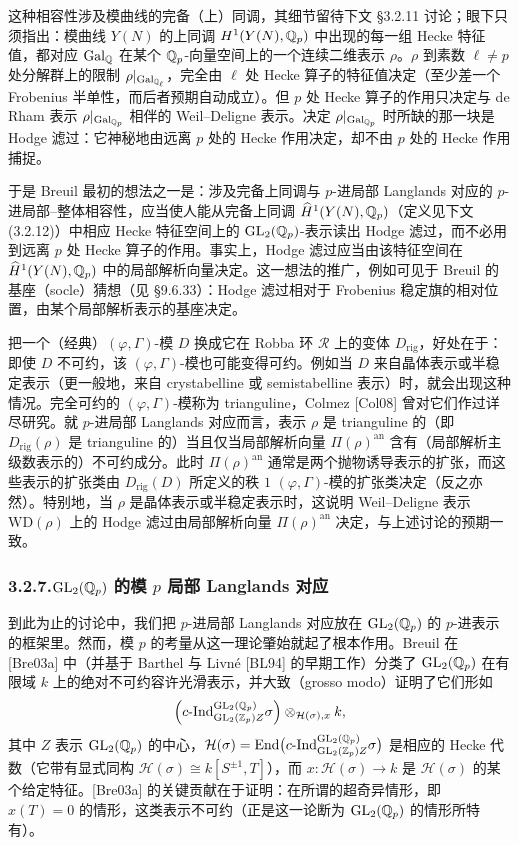 这种相容性涉及模曲线的完备（上）同调，其细节留待下文 §3.2.11 讨论；眼下只须指出：模曲线 $Y(N)$ 的上同调 $H^1(Y(N),\mathbb{Q}_p)$ 中出现的每一组 Hecke 特征值，都对应 $\operatorname{Gal}_{\mathbb{Q}}$ 在某个 $\mathbb{Q}_p$-向量空间上的一个连续二维表示 $\rho$。$\rho$ 到素数 $\ell\neq p$ 处分解群上的限制 $\rho|_{\operatorname{Gal}_{\mathbb{Q}_\ell}}$，完全由 $\ell$ 处 Hecke 算子的特征值决定（至少差一个 Frobenius 半单性，而后者预期自动成立）。但 $p$ 处 Hecke 算子的作用只决定与 de Rham 表示 $\rho|_{\operatorname{Gal}_{\mathbb{Q}_p}}$ 相伴的 Weil--Deligne 表示。决定 $\rho|_{\operatorname{Gal}_{\mathbb{Q}_p}}$ 时所缺的那一块是 Hodge 滤过：它神秘地由远离 $p$ 处的 Hecke 作用决定，却不由 $p$ 处的 Hecke 作用捕捉。

于是 Breuil 最初的想法之一是：涉及完备上同调与 $p$-进局部 Langlands 对应的 $p$-进局部--整体相容性，应当使人能从完备上同调 $\widehat H^1(Y(N),\mathbb{Q}_p)$（定义见下文 (3.2.12)）中相应 Hecke 特征空间上的 $\mathrm{GL}_2(\mathbb{Q}_p)$-表示读出 Hodge 滤过，而不必用到远离 $p$ 处 Hecke 算子的作用。事实上，Hodge 滤过应当由该特征空间在 $\widehat H^1(Y(N),\mathbb{Q}_p)$ 中的局部解析向量决定。这一想法的推广，例如可见于 Breuil 的基座（socle）猜想（见 §9.6.33）：Hodge 滤过相对于 Frobenius 稳定旗的相对位置，由某个局部解析表示的基座决定。

把一个（经典）$(\varphi,\Gamma)$-模 $D$ 换成它在 Robba 环 $\mathcal R$ 上的变体 $D_{\mathrm{rig}}$，好处在于：即使 $D$ 不可约，该 $(\varphi,\Gamma)$-模也可能变得可约。例如当 $D$ 来自晶体表示或半稳定表示（更一般地，来自 crystabelline 或 semistabelline 表示）时，就会出现这种情况。完全可约的 $(\varphi,\Gamma)$-模称为 trianguline，Colmez [Col08] 曾对它们作过详尽研究。就 $p$-进局部 Langlands 对应而言，表示 $\rho$ 是 trianguline 的（即 $D_{\mathrm{rig}}(\rho)$ 是 trianguline 的）当且仅当局部解析向量 $\Pi(\rho)^{\mathrm{an}}$ 含有（局部解析主级数表示的）不可约成分。此时 $\Pi(\rho)^{\mathrm{an}}$ 通常是两个抛物诱导表示的扩张，而这些表示的扩张类由 $D_{\mathrm{rig}}(D)$ 所定义的秩 $1$ $(\varphi,\Gamma)$-模的扩张类决定（反之亦然）。特别地，当 $\rho$ 是晶体表示或半稳定表示时，这说明 Weil--Deligne 表示 $\mathrm{WD}(\rho)$ 上的 Hodge 滤过由局部解析向量 $\Pi(\rho)^{\mathrm{an}}$ 决定，与上述讨论的预期一致。

\subsubsection*{3.2.7.\quad $\mathrm{GL}_2(\mathbb{Q}_p)$ 的模 $p$ 局部 Langlands 对应}

到此为止的讨论中，我们把 $p$-进局部 Langlands 对应放在 $\mathrm{GL}_2(\mathbb{Q}_p)$ 的 $p$-进表示的框架里。然而，模 $p$ 的考量从这一理论肇始就起了根本作用。Breuil 在 [Bre03a] 中（并基于 Barthel 与 Livné [BL94] 的早期工作）分类了 $\mathrm{GL}_2(\mathbb{Q}_p)$ 在有限域 $k$ 上的绝对不可约容许光滑表示，并大致（grosso modo）证明了它们形如
\[
\Bigl(c\text{-}\mathrm{Ind}_{\mathrm{GL}_2(\mathbb{Z}_p)Z}^{\mathrm{GL}_2(\mathbb{Q}_p)}\sigma\Bigr)\otimes_{\mathcal H(\sigma),x}k,
\]
其中 $Z$ 表示 $\mathrm{GL}_2(\mathbb{Q}_p)$ 的中心，$\mathcal H(\sigma)=\operatorname{End}\bigl(c\text{-}\mathrm{Ind}_{\mathrm{GL}_2(\mathbb{Z}_p)Z}^{\mathrm{GL}_2(\mathbb{Q}_p)}\sigma\bigr)$ 是相应的 Hecke 代数（它带有显式同构 $\mathcal H(\sigma)\cong k[S^{\pm1},T]$），而 $x:\mathcal H(\sigma)\to k$ 是 $\mathcal H(\sigma)$ 的某个给定特征。[Bre03a] 的关键贡献在于证明：在所谓的超奇异情形，即 $x(T)=0$ 的情形，这类表示不可约（正是这一论断为 $\mathrm{GL}_2(\mathbb{Q}_p)$ 的情形所特有）。

